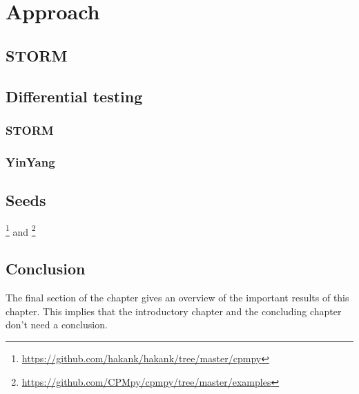 \chapter{Approach}
\label{cha:v}

\section{STORM}
\section{Differential testing}
\subsection{STORM}
\subsection{YinYang}

\section{Seeds}
\footnote{\url{https://github.com/hakank/hakank/tree/master/cpmpy}} and \cite{18bleukx2022model}
\footnote{\url{https://github.com/CPMpy/cpmpy/tree/master/examples}}

\section{Conclusion}
The final section of the chapter gives an overview of the important results
of this chapter. This implies that the introductory chapter and the
concluding chapter don't need a conclusion.

